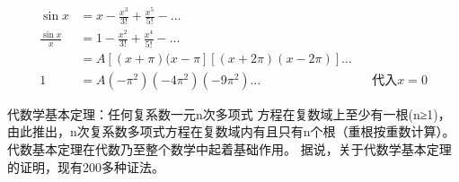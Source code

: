 \begin{thm}[How Euler compute $ \sum_{n=1}^{\infty} \frac{1}{n^2}   $]
\begin{align*}
		\sin x &= x- \frac{x^3}{3!} + \frac{x^5}{5!} -\ldots \\
		\frac{\sin x}{x} &= 1- \frac{x^2}{3!} + \frac{x^4}{5!} -\ldots \\
						 &= A[(x+\pi )(x-\pi ][(x+2\pi )(x-2\pi )]\ldots\\
		1&= A(-\pi ^2)(-4\pi ^2)(-9\pi ^2)\ldots   &&\text{代入} x=0
\end{align*}
\end{thm}
\begin{thm}[代数基本定理]
		代数学基本定理：任何复系数一元n次多项式 方程在复数域上至少有一根(n≥1)，由此推出，n次复系数多项式方程在复数域内有且只有n个根（重根按重数计算）。代数基本定理在代数乃至整个数学中起着基础作用。 据说，关于代数学基本定理的证明，现有200多种证法。
\end{thm}
\ifx\allfiles\undefined

\fi
